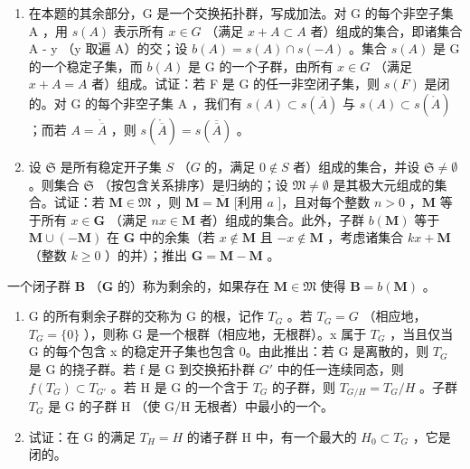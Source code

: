 \begin{enumerate}
\def\labelenumi{\alph{enumi})}
\setcounter{enumi}{1}
\item
  在本题的其余部分，G 是一个交换拓扑群，写成加法。对 G 的每个非空子集 A ，用 \(s(A)\) 表示所有 \(x \in G\) （满足 \(x + A \subset A\) 者）组成的集合，即诸集合 A - y （y 取遍 A）的交；设 \(b(A) = s(A) \cap s(-A)\) 。集合 \(s(A)\) 是 G 的一个稳定子集，而 \(b(A)\) 是 G 的一个子群，由所有 \(x \in G\) （满足 \(x + A = A\) 者）组成。试证：若 F 是 G 的任一非空闭子集，则 \(s(F)\) 是闭的。对 G 的每个非空子集 A ，我们有 \(s(A) \subset s(\overline{A})\) 与 \(s(A) \subset s(\mathring{A})\) ；而若 \(A = \mathring{\overline{A}}\) ，则 \(s(\mathring{\overline{A}}) = s(\overline{\overline{A}})\) 。
\item
  设 \(\mathfrak{S}\) 是所有稳定开子集 \(S\) （\(G\) 的，满足 \(0 \notin S\) 者）组成的集合，并设 \(\mathfrak{S} \neq \emptyset\) 。则集合 \(\mathfrak{S}\) （按包含关系排序）是归纳的；设 \(\mathfrak{M} \neq \emptyset\) 是其极大元组成的集合。试证：若 \(\mathbf{M} \in \mathfrak{M}\) ，则 \(\mathbf{M} = \overline{\mathbf{M}}\) {[}利用 \(a\) {]}，且对每个整数 \(n > 0\) ，\(\mathbf{M}\) 等于所有 \(x \in \mathbf{G}\) （满足 \(nx \in \mathbf{M}\) 者）组成的集合。此外，子群 \(b(\mathbf{M})\) 等于 \(\mathbf{M} \cup (-\mathbf{M})\) 在 \(\mathbf{G}\) 中的余集（若 \(x \notin \mathbf{M}\) 且 \(-x \notin \mathbf{M}\) ，考虑诸集合 \(kx + \mathbf{M}\) （整数 \(k \geqslant 0\) ）的并）；推出 \(\mathbf{G} = \mathbf{M} - \mathbf{M}\) 。
\end{enumerate}

一个闭子群 \(\mathbf{B}\) （\(\mathbf{G}\) 的）称为剩余的，如果存在 \(\mathbf{M} \in \mathfrak{M}\) 使得 \(\mathbf{B} = b(\mathbf{M})\) 。

\begin{enumerate}
\def\labelenumi{\alph{enumi})}
\setcounter{enumi}{3}
\item
  G 的所有剩余子群的交称为 G 的根，记作 \(T_{G}\) 。若 \(T_{G}=G\) （相应地，\(T_{G}=\{0\}\) ），则称 G 是一个根群（相应地，无根群）。x 属于 \(T_{G}\) ，当且仅当 G 的每个包含 x 的稳定开子集也包含 0。由此推出：若 G 是离散的，则 \(T_{G}\) 是 G 的挠子群。若 f 是 G 到交换拓扑群 \(G'\) 中的任一连续同态，则 \(f(T_{G})\subset T_{G'}\) 。若 H 是 G 的一个含于 \(T_{G}\) 的子群，则 \(T_{G/H}=T_{G}/H\) 。子群 \(T_{G}\) 是 G 的子群 H （使 G/H 无根者）中最小的一个。
\item
  试证：在 G 的满足 \(T_{H} = H\) 的诸子群 H 中，有一个最大的 \(H_{0} \subset T_{G}\) ，它是闭的。
\end{enumerate}

